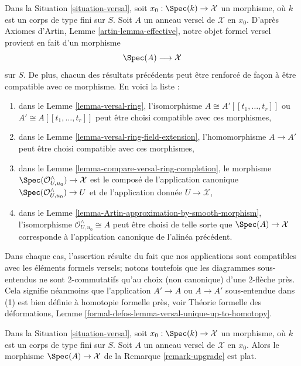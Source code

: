 \begin{remark}
\label{remark-upgrade}
Dans la Situation \ref{situation-versal}, soit $x_0 : \Spec(k) \to \mathcal{X}$
un morphisme, où $k$ est un corps de type fini sur $S$.
Soit $A$ un anneau versel de $\mathcal{X}$ en $x_0$. D'après Axiomes d'Artin,
Lemme \ref{artin-lemma-effective}, notre objet formel versel
provient en fait d'un morphisme
$$
\Spec(A) \longrightarrow \mathcal{X}
$$
sur $S$. De plus, chacun des résultats précédents peut être renforcé de façon
à être compatible avec ce morphisme. En voici la liste :
\begin{enumerate}
\item dans le Lemme \ref{lemma-versal-ring}, l'isomorphisme
$A \cong A'[[t_1, \ldots, t_r]]$ ou $A' \cong A[[t_1, \ldots, t_r]]$
peut être choisi compatible avec ces morphismes,
\item dans le Lemme \ref{lemma-versal-ring-field-extension},
l'homomorphisme $A \to A'$ peut être choisi compatible avec ces morphismes,
\item dans le Lemme \ref{lemma-compare-versal-ring-completion},
le morphisme $\Spec(\mathcal{O}_{U, u_0}^\wedge) \to \mathcal{X}$
est le composé de l'application canonique
$\Spec(\mathcal{O}_{U, u_0}^\wedge) \to U$ et de l'application donnée
$U \to \mathcal{X}$,
\item dans le Lemme \ref{lemma-Artin-approximation-by-smooth-morphism},
l'isomorphisme $\mathcal{O}_{U, u_0}^\wedge \cong A$ peut
être choisi de telle sorte que $\Spec(A) \to \mathcal{X}$ corresponde à l'application canonique
de l'alinéa précédent.
\end{enumerate}
Dans chaque cas, l'assertion résulte du fait que nos applications sont
compatibles avec les éléments formels versels; notons toutefois que les
diagrammes sous-entendus ne sont $2$-commutatifs qu'au choix (non canonique)
d'une $2$-flèche près. Cela signifie néanmoins que l'application $A' \to A$
ou $A \to A'$ sous-entendue dans (1) est bien définie à homotopie formelle près, voir
Théorie formelle des déformations, Lemme
\ref{formal-defos-lemma-versal-unique-up-to-homotopy}.
\end{remark}

\begin{lemma}
\label{lemma-versal-ring-flat}
Dans la Situation \ref{situation-versal}, soit $x_0 : \Spec(k) \to \mathcal{X}$
un morphisme, où $k$ est un corps de type fini sur $S$.
Soit $A$ un anneau versel de $\mathcal{X}$ en $x_0$.
Alors le morphisme $\Spec(A) \to \mathcal{X}$ de la
Remarque \ref{remark-upgrade} est plat.
\end{lemma}

